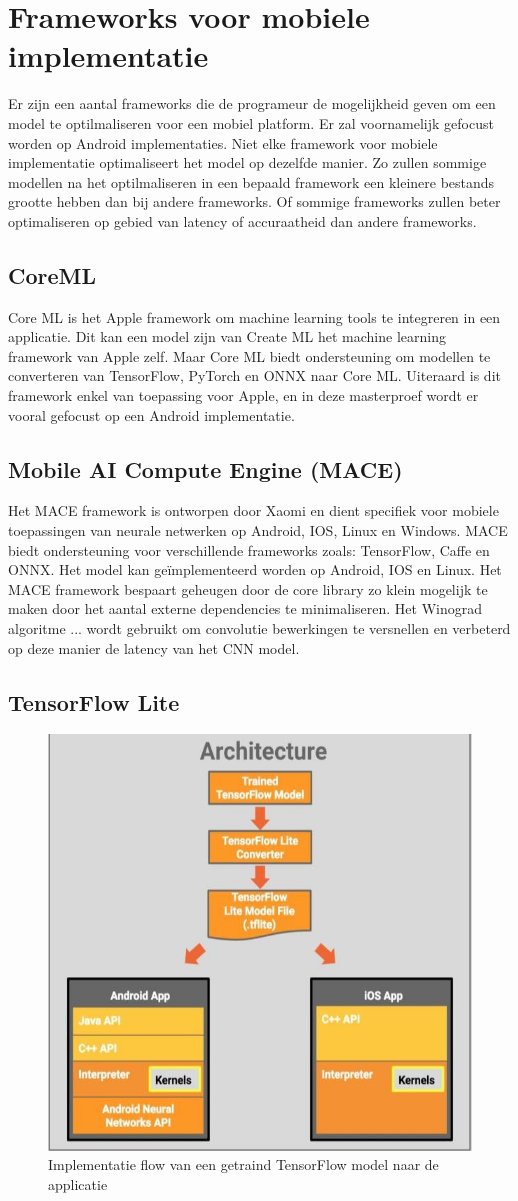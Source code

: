 \section{Frameworks voor mobiele implementatie}
Er zijn een aantal frameworks die de programeur de mogelijkheid geven om een model te optilmaliseren voor een mobiel platform.
Er zal voornamelijk gefocust worden op Android implementaties.
Niet elke framework voor mobiele implementatie optimaliseert het model op dezelfde manier.
Zo zullen sommige modellen na het optilmaliseren in een bepaald framework een kleinere bestands grootte hebben dan bij andere frameworks.
Of sommige frameworks zullen beter optimaliseren op gebied van latency of accuraatheid dan andere frameworks.

\subsection{CoreML}
Core ML is het Apple framework om machine learning tools te integreren in een applicatie.
Dit kan een model zijn van Create ML het machine learning framework van Apple zelf.
Maar Core ML biedt ondersteuning om modellen te converteren van TensorFlow, PyTorch en ONNX naar Core ML.
Uiteraard is dit framework enkel van toepassing voor Apple, en in deze masterproef wordt er vooral gefocust op een Android implementatie.

\subsection{Mobile AI Compute Engine (MACE)}
Het MACE framework is ontworpen door Xaomi en dient specifiek voor mobiele toepassingen van neurale netwerken op Android, IOS, Linux en Windows.
MACE biedt ondersteuning voor verschillende frameworks zoals: TensorFlow, Caffe en ONNX.
Het model kan ge\"implementeerd worden op Android, IOS en Linux.
Het MACE framework bespaart geheugen door de core library zo klein mogelijk te maken door het aantal externe dependencies te minimaliseren.
Het Winograd algoritme ... wordt gebruikt om convolutie bewerkingen te versnellen en verbeterd op deze manier de latency van het CNN model.

\subsection{TensorFlow Lite}
\begin{figure}[!ht]
    \centering
 	\includegraphics[width=0.5\linewidth]{fig/TFLite.jpg}
 	\caption{Implementatie flow van een getraind TensorFlow model naar de applicatie}
 	\label{fig:tflite}
\end{figure}

